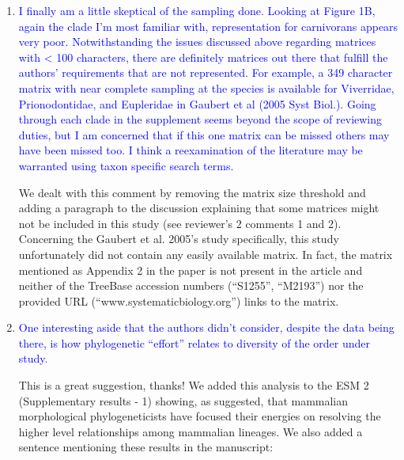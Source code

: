 \documentclass[12pt,letterpaper]{article}
\begin{document}
\begin{enumerate}
\item{\textcolor{blue}{I finally am a little skeptical of the sampling done. Looking at Figure 1B, again the clade I'm most familiar with, representation for carnivorans appears very poor. Notwithstanding the issues discussed above regarding matrices with < 100 characters, there are definitely matrices out there that fulfill the authors' requirements that are not represented. For example, a 349 character matrix with near complete sampling at the species is available for Viverridae, Prionodontidae, and Eupleridae in Gaubert et al (2005 Syst Biol.). Going through each clade in the supplement seems beyond the scope of reviewing duties, but I am concerned that if this one matrix can be missed others may have been missed too. I think a reexamination of the literature may be warranted using taxon specific search terms.}}

We dealt with this comment by removing the matrix size threshold and adding a paragraph to the discussion explaining that some matrices might not be included in this study (see reviewer's 2 comments 1 and 2).
Concerning the Gaubert et al. 2005's study specifically, this study unfortunately did not contain any easily available matrix.
In fact, the matrix mentioned as Appendix 2 in the paper is not present in the article and neither of the TreeBase accession numbers (``S1255'', ``M2193'') nor the provided URL (``www.systematicbiology.org'') links to the matrix.

\item{\textcolor{blue}{One interesting aside that the authors didn't consider, despite the data being there, is how phylogenetic ``effort'' relates to diversity of the order under study.}}

This is a great suggestion, thanks!
We added this analysis to the ESM 2 (Supplementary results - 1) showing, as suggested, that mammalian morphological phylogeneticists have focused their energies on resolving the higher level relationships among mammalian lineages.
We also added a sentence mentioning these results in the manuscript:


\end{enumerate}
\end{document}
